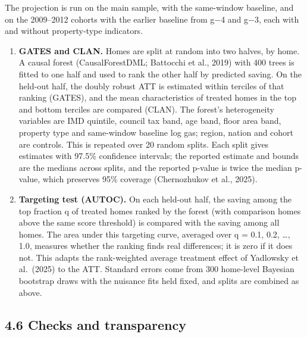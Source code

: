 \documentclass[11pt,a4paper]{article}
\providecommand{\tightlist}{\setlength{\itemsep}{0pt}\setlength{\parskip}{0pt}}
\begin{document}
The projection is run on the main sample, with the same-window baseline, and on the 2009--2012 cohorts with the earlier baseline from g−4 and g−3, each with and without property-type indicators.

\begin{enumerate}
\def\labelenumi{\arabic{enumi}.}
\setcounter{enumi}{1}
\tightlist
\item
  \textbf{GATES and CLAN.} Homes are split at random into two halves, by home. A causal forest (CausalForestDML; Battocchi et al., 2019) with 400 trees is fitted to one half and used to rank the other half by predicted saving. On the held-out half, the doubly robust ATT is estimated within terciles of that ranking (GATES), and the mean characteristics of treated homes in the top and bottom terciles are compared (CLAN). The forest's heterogeneity variables are IMD quintile, council tax band, age band, floor area band, property type and same-window baseline log gas; region, nation and cohort are controls. This is repeated over 20 random splits. Each split gives estimates with 97.5\% confidence intervals; the reported estimate and bounds are the medians across splits, and the reported p-value is twice the median p-value, which preserves 95\% coverage (Chernozhukov et al., 2025).
\item
  \textbf{Targeting test (AUTOC).} On each held-out half, the saving among the top fraction q of treated homes ranked by the forest (with comparison homes above the same score threshold) is compared with the saving among all homes. The area under this targeting curve, averaged over q = 0.1, 0.2, \ldots, 1.0, measures whether the ranking finds real differences; it is zero if it does not. This adapts the rank-weighted average treatment effect of Yadlowsky et al.~(2025) to the ATT. Standard errors come from 300 home-level Bayesian bootstrap draws with the nuisance fits held fixed, and splits are combined as above.
\end{enumerate}

\subsection*{4.6 Checks and transparency}
\end{document}
